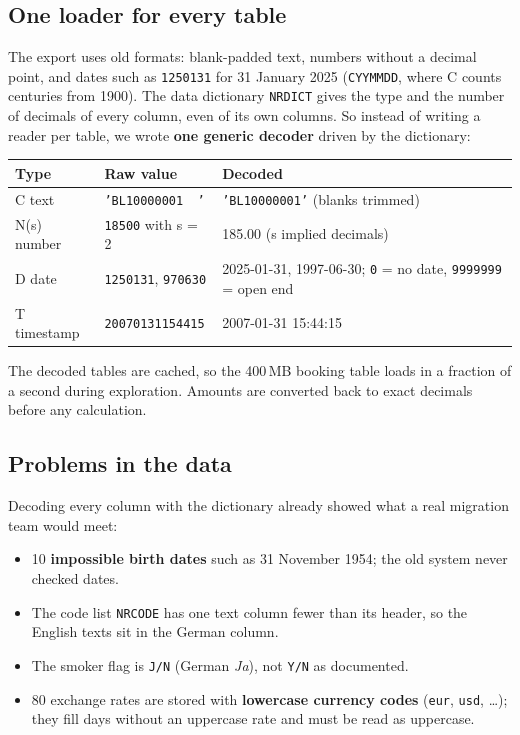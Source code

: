 \documentclass[11pt,a4paper]{article}
\newcommand{\code}[1]{\texttt{#1}}
\begin{document}
\subsection{One loader for every table}
The export uses old formats: blank-padded text, numbers without a decimal point, and dates such as \code{1250131}
for 31 January 2025 (\code{CYYMMDD}, where C counts centuries from 1900). The data dictionary \code{NRDICT} gives the
type and the number of decimals of every column, even of its own columns. So instead of writing a reader per table,
we wrote \textbf{one generic decoder} driven by the dictionary:

\begin{center}
\begin{tabularx}{\textwidth}{@{}llL@{}}
\toprule
Type & Raw value & Decoded \\
\midrule
C text & \code{'BL10000001\ \ '} & \code{'BL10000001'} (blanks trimmed) \\
N(s) number & \code{18500} with s = 2 & 185.00 (s implied decimals) \\
D date & \code{1250131}, \code{970630} & 2025-01-31, 1997-06-30; \code{0} = no date, \code{9999999} = open end \\
T timestamp & \code{20070131154415} & 2007-01-31 15:44:15 \\
\bottomrule
\end{tabularx}
\end{center}

The decoded tables are cached, so the 400\,MB booking table loads in a fraction of a second during exploration.
Amounts are converted back to exact decimals before any calculation.

\subsection{Problems in the data}
Decoding every column with the dictionary already showed what a real migration team would meet:
\begin{itemize}
  \item 10 \textbf{impossible birth dates} such as 31 November 1954; the old system never checked dates.
  \item The code list \code{NRCODE} has one text column fewer than its header, so the English texts sit in the
        German column.
  \item The smoker flag is \code{J/N} (German \emph{Ja}), not \code{Y/N} as documented.
  \item 80 exchange rates are stored with \textbf{lowercase currency codes} (\code{eur}, \code{usd}, \ldots); they fill
        days without an uppercase rate and must be read as uppercase.
\end{itemize}
\end{document}
